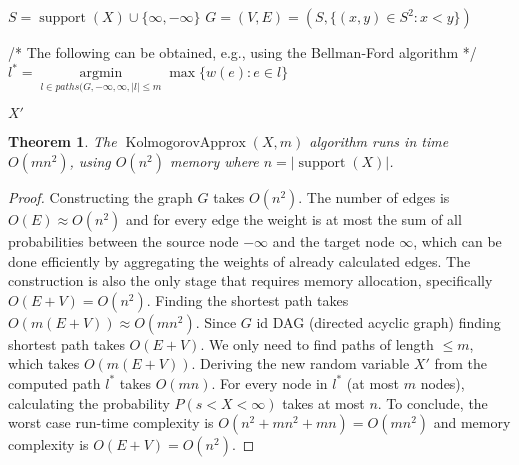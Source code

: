 \documentclass{article}
\newtheorem{theorem}[thm]{Theorem}
\DeclareMathOperator{\support}{support}
\DeclareMathOperator{\KlmApprox}{KolmogorovApprox}
\begin{document}
\begin{algorithm}\label{alg:optapprox}
	\DontPrintSemicolon
	$S = \support(X)\cup \{\infty,-\infty\}$\;
	$G=(V,E)=(S, \{ (x,y) \in S^2 \colon  x<y \})$ \;
	
	
	/* The following can be obtained, e.g., using the Bellman-Ford algorithm */\;
	$l^*= \operatorname{argmin}\limits_{l \in paths(G, -\infty, \infty,|l|\leq m}  \max \{ w(e)\colon e \in l  \}$ \;
	
	\Return $X'$\;
	
	\caption{$\KlmApprox (X, m)$}  
	\label{alg:sequence}
\end{algorithm}

\begin{theorem}\label{the:complexity}
	The $\KlmApprox(X,m)$ algorithm runs in time $O(mn^2)$, using $O(n^2)$ memory where $n=|\support(X)|$.
\end{theorem}

\begin{proof}
	Constructing the graph $G$ takes $O(n^2)$. The number of edges is $O(E)\approx O(n^2)$ and for every edge the weight is at most the sum of all probabilities between the source node $-\infty$ and the target node $\infty$, which can be done efficiently by aggregating the weights of already calculated edges. 
	The construction is also the only stage that requires memory allocation, specifically $O(E+V)=O(n^2)$.
	Finding the shortest path takes $O(m(E+V))\approx O(mn^2)$. Since $G$ id DAG (directed acyclic graph) finding shortest path takes $O(E+V)$. We only need to find paths of length $\leq m$, which takes $O(m(E+V))$.
	Deriving the new random variable $X'$ from the computed path $l^*$ takes $O(mn)$. For every node in $l^*$ (at most $m$ nodes), calculating the probability $P(s<X<\infty)$ takes at most $n$. 
	To conclude, the worst case run-time complexity is $O(n^2+mn^2+mn)=O(mn^2)$ and memory complexity is $O(E+V)=O(n^2)$.
\end{proof}
\end{document}

